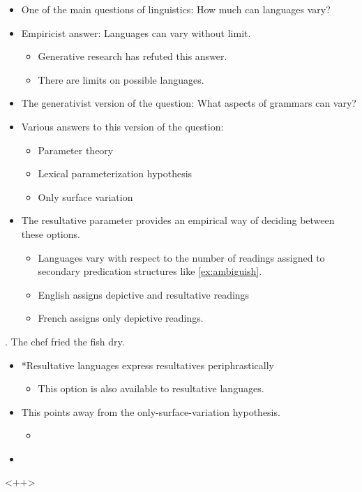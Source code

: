 \documentclass[letterpaper,12pt]{article}
\begin{document}
\begin{itemize}
	\item One of the main questions of linguistics: How much can languages vary?
	\item Empiricist answer: Languages can vary without limit.
		\begin{itemize}
			\item Generative research has refuted this answer.
			\item There are limits on possible languages.
		\end{itemize}
	\item The generativist version of the question: What aspects of grammars can vary?
	\item Various answers to this version of the question:
		\begin{itemize}
			\item Parameter theory
			\item Lexical parameterization hypothesis
			\item Only surface variation
		\end{itemize}
	\item The resultative parameter provides an empirical way of deciding between these options.
		\begin{itemize}
			\item Languages vary with respect to the number of readings assigned to secondary predication structures like \ref{ex:ambiguish}.
			\item English assigns depictive and resultative readings
			\item French assigns only depictive readings.
		\end{itemize}
\end{itemize}
\ex.\label{ex:ambiguish} The chef fried the fish dry.

\begin{itemize}
	\item *Resultative languages express resultatives periphrastically
		\begin{itemize}
			\item This option is also available to resultative languages.
		\end{itemize}
\end{itemize}
\begin{itemize}
	\item This points away from the only-surface-variation hypothesis.
		\begin{itemize}
			\item 
		\end{itemize}
\end{itemize}
\begin{itemize}
	\item \textcite{snyder2001nature} 
\end{itemize}<++>
\end{document}
